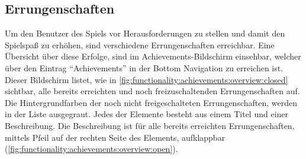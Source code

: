 \documentclass[a4paper]{article}
\begin{document}
\subsection{Errungenschaften}
\label{subsec:functionality:achievements}
Um den Benutzer des Spiels vor Herausforderungen zu stellen und damit den Spielspaß zu erhöhen, sind verschiedene Errungenschaften erreichbar. Eine Übersicht über diese Erfolge, sind im Achievements-Bildschirm einsehbar, welcher über den Eintrag "`Achievements"' in der Bottom Navigation zu erreichen ist. Dieser Bildschirm listet, wie in \autoref{fig:functionality:achievements:overview:closed} sichtbar, alle bereits erreichten und noch freizuschaltenden Errungenschaften auf. Die Hintergrundfarben der noch nicht freigeschalteten Errungenschaften, werden in der Liste ausgegraut. Jedes der Elemente besteht aus einem Titel und einer Beschreibung. Die Beschreibung ist für alle bereits erreichten Errungenschaften, mittels Pfeil auf der rechten Seite des Elements, aufklappbar (\autoref{fig:functionality:achievements:overview:open}).
\end{document}
